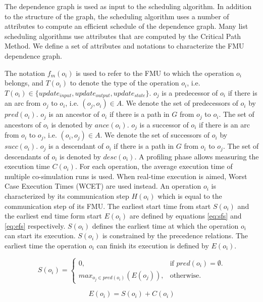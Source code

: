The dependence graph is used as input to the scheduling algorithm. In addition to the structure of the graph, the scheduling algorithm uses a number of attributes to compute an efficient schedule of the dependence graph. Many list scheduling algorithms use attributes that are computed by the Critical Path Method. We define a set of attributes and notations to characterize the FMU dependence graph.

The notation $f_m(o_i)$ is used to refer to the FMU to which the operation $o_i$ belongs, and $T(o_i)$ to denote the type of the operation $o_i$, i.e. $T(o_i) \in \{update_{input}, update_{output}, update_{state}\}$. $o_j$ is a predecessor of $o_i$ if there is an arc from $o_j$ to $o_i$, i.e. $(o_j, o_i) \in A$. We denote the set of predecessors of $o_i$ by $pred(o_i)$. $o_j$ is an ancestor of $o_i$ if there is a path in $G$ from $o_j$ to $o_i$. The set of ancestors of $o_i$ is denoted by $ance(o_i)$. $o_j$ is a successor of $o_i$ if there is an arc from $o_i$ to $o_j$, i.e. $(o_i, o_j) \in A$. We denote the set of successors of $o_i$ by $succ(o_i)$. $o_j$ is a descendant of $o_i$ if there is a path in $G$ from $o_i$ to $o_j$. The set of descendants of $o_i$ is denoted by $desc(o_i)$. A profiling phase allows measuring the execution time $C(o_i)$. For each operation, the average execution time of multiple co-simulation runs is used. When real-time execution is aimed, Worst Case Execution Times (WCET) are used instead. An operation $o_i$ is characterized by its communication step $H(o_i)$ which is equal to the communication step of its FMU. The earliest start time from start $S(o_i)$ and the earliest end time form start $E(o_i)$ are defined by equations \ref{eq:sfs} and \ref{eq:efs} respectively. $S(o_i)$ defines the earliest time at which the operation $o_i$ can start its execution. $S(o_i)$ is constrained by the precedence relations. The earliest time the operation $o_i$ can finish its execution is defined by $E(o_i)$.

\begin{equation}
S(o_i)=\begin{cases}
    0, & \text{if $pred(o_i)=\emptyset$}.\\
    max_{o_j \in pred(o_i)}(E(o_j)), & \text{otherwise}.
  \end{cases}
	\label{eq:sfs}
\end{equation}

\begin{equation}
	E(o_i)=S(o_i)+C(o_i) 
	\label{eq:efs}
\end{equation}


